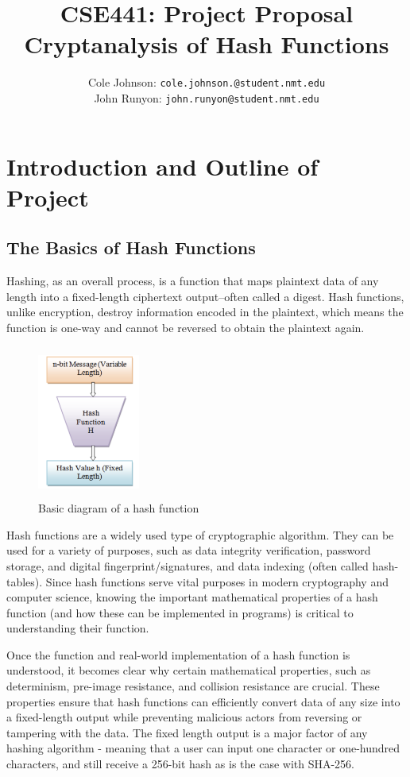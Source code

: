 \documentclass[12pt,english]{article}
\author{
    Cole Johnson: \texttt{cole.johnson.@student.nmt.edu}
    \\ 
    John Runyon: \texttt{john.runyon@student.nmt.edu}
}
\title{
    CSE441: Project Proposal\\
    \large{Cryptanalysis of Hash Functions}
}
\begin{document}
\maketitle
\section*{Introduction and Outline of Project}
\subsection{The Basics of Hash Functions}
Hashing, as an overall process, is a function that maps
plaintext data of any length into a fixed-length ciphertext
output--often called a digest. Hash functions, unlike encryption,
destroy information encoded in the plaintext, which means
the function is one-way and cannot be reversed to obtain
the plaintext again.

\begin{figure}
    \begin{center}
      \includegraphics[clip=true,height=5cm, width=0.3\textwidth]{images/hash_function.png}
    \end{center}
    \caption{Basic diagram of a hash function}
  \end{figure}

Hash functions are a widely used type of cryptographic algorithm.
They can be used for a variety of purposes, such as
data integrity verification, password storage, and digital
fingerprint/signatures, and data indexing (often called hash-tables).
Since hash functions serve vital purposes in modern cryptography
and computer science, knowing the important mathematical properties
of a hash function (and how these can be implemented in programs)
is critical to understanding their function.

Once the function and real-world implementation of a
hash function is understood, it becomes clear why 
certain mathematical properties, such as determinism, 
pre-image resistance, and collision resistance are crucial. 
These properties ensure that hash functions can efficiently 
convert data of any size into a fixed-length output while 
preventing malicious actors from reversing or tampering with 
the data. The fixed length output is a major factor of any 
hashing algorithm - meaning that a user can input one character 
or one-hundred characters, and still receive a 256-bit hash as 
is the case with SHA-256.
\end{document}
